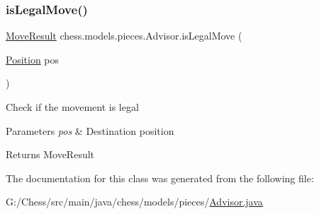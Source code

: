 \mbox{\label{classchess_1_1models_1_1pieces_1_1_advisor_afd4015213fb9b97240f4235a9776f972}} 
\subsubsection{\texorpdfstring{is\+Legal\+Move()}{isLegalMove()}}
{\footnotesize\ttfamily \mbox{\hyperlink{enumchess_1_1models_1_1enums_1_1_move_result}{Move\+Result}} chess.\+models.\+pieces.\+Advisor.\+is\+Legal\+Move (\begin{DoxyParamCaption}\item[{\mbox{\hyperlink{classchess_1_1models_1_1_position}{Position}}}]{pos }\end{DoxyParamCaption})}

Check if the movement is legal


\begin{DoxyParams}{Parameters}
{\em pos} & Destination position \\
\hline
\end{DoxyParams}
\begin{DoxyReturn}{Returns}
Move\+Result 
\end{DoxyReturn}


The documentation for this class was generated from the following file\+:\begin{DoxyCompactItemize}
\item 
G\+:/\+Chess/src/main/java/chess/models/pieces/\mbox{\hyperlink{_advisor_8java}{Advisor.\+java}}\end{DoxyCompactItemize}
